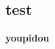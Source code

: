 \documentclass[10pt, a4paper]{article}
\begin{document}


{}
\setcounter{page}{1}

\section{}

\subsection{test}


\textbf{youpidou}
\end{document}
